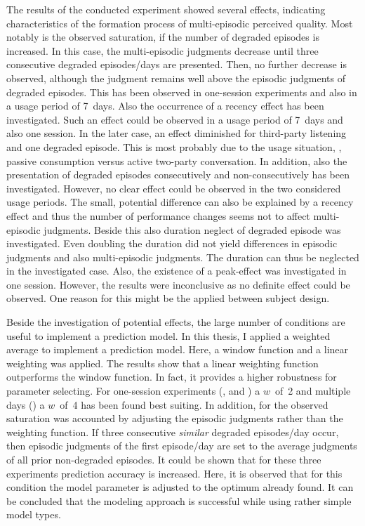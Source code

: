 The results of the conducted experiment showed several effects, indicating characteristics of the formation process of multi-episodic perceived quality.
Most notably is the observed saturation, if the number of degraded episodes is increased.
In this case, the multi-episodic judgments decrease until three consecutive degraded episodes/days are presented.
Then, no further decrease is observed, although the judgment remains well above the episodic judgments of degraded episodes.
This has been observed in one-session experiments and also in a usage period of 7~days.
Also the occurrence of a recency effect has been investigated.
Such an effect could be observed in a usage period of 7~days and also one session.
In the later case, an effect diminished for third-party listening and one degraded episode.
This is most probably due to the usage situation, \ie, passive consumption versus active two-party conversation.
In addition, also the presentation of degraded episodes consecutively and non-consecutively has been investigated.
However, no clear effect could be observed in the two considered usage periods.
The small, potential difference can also be explained by a recency effect and thus the number of performance changes seems not to affect multi-episodic judgments.
Beside this also duration neglect of degraded episode was investigated.
Even doubling the duration did not yield differences in episodic judgments and also multi-episodic judgments.
The duration can thus be neglected in the investigated case.
Also, the existence of a peak-effect was investigated in one session.
However, the results were inconclusive as no definite effect could be observed.
One reason for this might be the applied between subject design.

Beside the investigation of potential effects, the large number of conditions are useful to implement a prediction model.
In this thesis, I applied a weighted average to implement a prediction model.
Here, a window function and a linear weighting was applied.
The results show that a linear weighting function outperforms the window function.
In fact, it provides a higher robustness for parameter selecting.
For one-session experiments (, and \EIIa{}) a $\mathit{w}$~of~2 and multiple days () a $\mathit{w}$~of~4  has been found best suiting.
In addition, for the observed saturation was accounted by adjusting the episodic judgments rather than the weighting function.
If three consecutive \emph{similar} degraded episodes/day occur, then episodic judgments of the first episode/day are set to the average judgments of all prior non-degraded episodes.
It could be shown that for these three experiments prediction accuracy is increased.
Here, it is observed that for this condition the model parameter is adjusted to the optimum already found.
It can be concluded that the modeling approach is successful while using rather simple model types.


